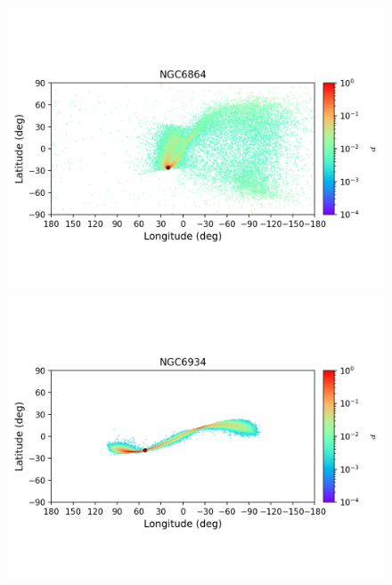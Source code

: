         \begin{figure}
            \begin{center}
                \includegraphics[clip=true, trim = 0mm 20mm 0mm 10mm, width=1\columnwidth]{images/error_plots_NGC6864.png}
                \includegraphics[clip=true, trim = 0mm 20mm 0mm 10mm, width=1\columnwidth]{images/error_plots_NGC6934.png}
                

\end{center}
\end{figure}
